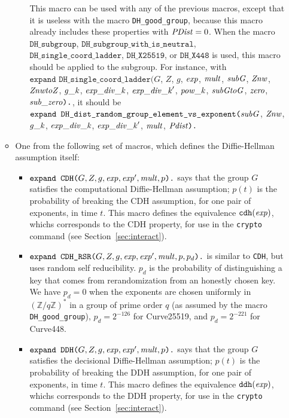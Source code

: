 \documentclass{article}
\begin{document}
\begin{itemize}
\begin{itemize}
\begin{itemize}
     This macro can be used with any of the previous macros, except
     that it is useless with the macro \texttt{DH\_good\_group}, because this macro
     already includes these properties with $\mathit{PDist} = 0$. When the macro 
$\texttt{DH\_subgroup}$, $\texttt{DH\_subgroup\_with\_is\_neutral}$, $\texttt{DH\_single\_coord\_ladder}$, $\texttt{DH\_X25519}$, or $\texttt{DH\_X448}$ is used, this macro should be applied to the subgroup. For instance, with
$\texttt{expand\ DH\_single\_coord\_ladder}(G$, $Z$, $g$, $\mathit{exp}$, $\mathit{mult}$, $\mathit{subG}$, $\mathit{Znw}$, $\mathit{ZnwtoZ}$, $\mathit{g\_k}$, $\mathit{exp\_div\_k}$, $\mathit{exp\_div\_k}'$, $\mathit{pow\_k}$, $\mathit{subGtoG}$, $\mathit{zero}$, $\mathit{sub\_zero}\texttt{).}$, it should be
     $\texttt{expand\ DH\_dist\_random\_group\_element\_vs\_exponent(}\vn{subG}$, $\mathit{Znw}$, $\mathit{g\_k}$, $\mathit{exp\_div\_k}$, $\mathit{exp\_div\_k}'$, $\mathit{mult}$, $\mathit{Pdist}\texttt{).}$
     \end{itemize}
   \item One from the following set of macros, which defines the Diffie-Hellman assumption itself:
     \begin{itemize}
     \item $\texttt{expand\ CDH(}G, Z, g, \mathit{exp}, \mathit{exp}', \mathit{mult}, p\texttt{).}$ says that the group $G$ satisfies the computational
  Diffie-Hellman assumption; $p(t)$ is the probability of breaking the CDH assumption, for one pair of exponents, in time $t$.
   This macro defines the equivalence $\texttt{cdh}(\mathit{exp})$, whichs corresponds to the CDH property, for use in the
   \texttt{crypto} command (see Section~\ref{sec:interact}).

     \item $\texttt{expand\ CDH\_RSR(}G, Z, g, \mathit{exp}, \mathit{exp}', \mathit{mult}, p, p_d\texttt{).}$ 
       is similar to \texttt{CDH}, but uses random self reducibility.
       $p_d$ is the probability of distinguishing a key that comes from rerandomization from
       an honestly chosen key. We have $p_d = 0$ when the exponents 
       are chosen uniformly in $(\mathbb{Z}/q\mathbb{Z})^*$ in a group of prime order $q$
       (as assumed by the macro \texttt{DH\_good\_group}),
       $p_d = 2^{-126}$ for Curve25519, and $p_d = 2^{-221}$ for Curve448.

     \item $\texttt{expand\ DDH(}G, Z, g, \mathit{exp}, \mathit{exp}', \mathit{mult}, p\texttt{).}$
       says that the group $G$ satisfies the decisional Diffie-Hellman
       assumption; $p(t)$ is the probability of breaking the DDH
       assumption, for one pair of exponents, in time $t$.
   This macro defines the equivalence $\texttt{ddh}(\mathit{exp})$, whichs corresponds to the DDH property, for use in the
   \texttt{crypto} command (see Section~\ref{sec:interact}).


\end{itemize}
\end{itemize}
\end{itemize}
\end{document}
